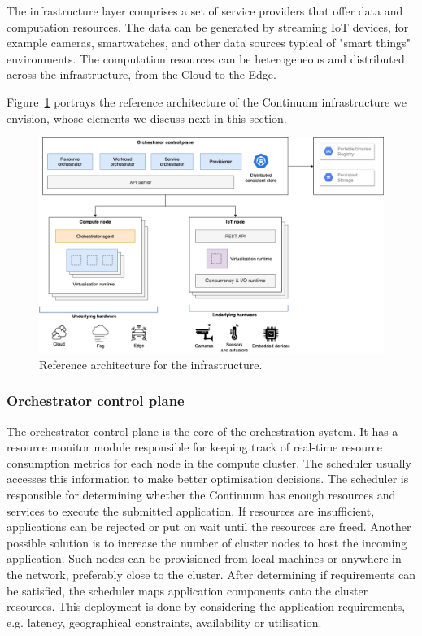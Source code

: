 The infrastructure layer comprises a set of service providers that offer data and computation resources. The data can be generated by streaming IoT devices, for example cameras, smartwatches, and other data sources typical of "smart things" environments. 
The computation resources can be heterogeneous and distributed across the infrastructure, from the Cloud to the Edge.

Figure~\ref{fig:architecture-broad} portrays the reference architecture of the Continuum infrastructure we envision, whose elements we discuss next in this section.
\begin{figure}[ht]
\centering
\includegraphics[width=\columnwidth]{figures/architecture-broad}
\caption{Reference architecture for the infrastructure.}
\label{fig:architecture-broad}
\end{figure}

\subsubsection{Orchestrator control plane}

The orchestrator control plane is the core of the orchestration system. It has a resource monitor module responsible for keeping track of real-time resource consumption metrics for each node in the compute cluster. The scheduler usually accesses this information to make better optimisation decisions. The scheduler is responsible for determining whether the Continuum has enough resources and services to execute the submitted application. If resources are insufficient, applications can be rejected or put on wait until the resources are freed. Another possible solution is to increase the number of cluster nodes to host the incoming application. Such nodes can be provisioned from local machines or anywhere in the network, preferably close to the cluster. After determining if requirements can be satisfied, the scheduler maps application components onto the cluster resources. This deployment is done by considering the application requirements, e.g. latency, geographical constraints, availability or utilisation.

